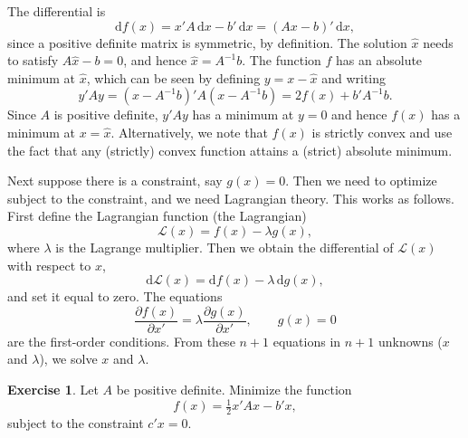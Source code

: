 \documentclass[12pt,a4paper]{article}
\makeatletter
\theoremstyle{definition}
\newtheorem{exercise}{Exercise}
\renewenvironment{proof}[1][\proofname]{\par
  \pushQED{\qed}%
  \normalfont \topsep6\p@\@plus6\p@\relax
  \trivlist
  \item[\hskip\labelsep\bfseries #1\@addpunct{.}]\ignorespaces
}{%
  \popQED\endtrivlist\@endpefalse
}
\newenvironment{solution}{%
  \begin{proof}[Solution]%
}{%
  \end{proof}%
}
\newcommand{\dd}{\mathrm{d}}
\makeatother
\begin{document}
\begin{solution}
The differential is
\[
\dd f(x) = x'A\, \dd x - b'\, \dd x = (Ax - b)'\, \dd x,
\]
since a positive definite matrix is symmetric, by definition. The solution $\hat{x}$ needs to satisfy $A\hat{x} - b = 0$, and hence $\hat{x} = A^{-1}b$. %
The function $f$ has an absolute minimum at $\hat{x}$, which can be seen by defining $y = x - \hat{x}$ and writing
\[
y'Ay = (x - A^{-1}b)'A(x - A^{-1}b) = 2f(x) + b'A^{-1}b.
\]
Since $A$ is positive definite, $y'Ay$ has a minimum at $y = 0$ and hence $f(x)$ has a minimum at $x = \hat{x}$. Alternatively, we note that $f(x)$ is strictly convex and use the fact that any (strictly) convex function attains a (strict) absolute minimum. %
\end{solution}

Next suppose there is a constraint, say $g(x) = 0$. Then we need to optimize subject to the constraint, and we need Lagrangian theory. This works as follows. First define the Lagrangian function (the Lagrangian)
\begin{equation}\label{eq:20}
\mathcal{L}(x) = f(x) - \lambda g(x),
\end{equation}
where $\lambda$ is the Lagrange multiplier. Then we obtain the differential of $\mathcal{L}(x)$ with respect to $x$,
\begin{equation}\label{eq:21}
\dd\mathcal{L}(x) = \dd f(x) - \lambda\, \dd g(x),
\end{equation}
and set it equal to zero. %
The equations
\begin{equation}\label{eq:22}
\frac{\partial f(x)}{\partial x'} = \lambda \frac{\partial g(x)}{\partial x'}, \qquad g(x) = 0
\end{equation}
are the first-order conditions. From these $n+1$ equations in $n+1$ unknowns ($x$ and $\lambda$), we solve $x$ and $\lambda$. %

\begin{exercise}\label{exer:15}
Let $A$ be positive definite. Minimize the function
\[
f(x) = \tfrac{1}{2} x'Ax - b'x,
\]
subject to the constraint $c'x = 0$.
\end{exercise}
\end{document}
